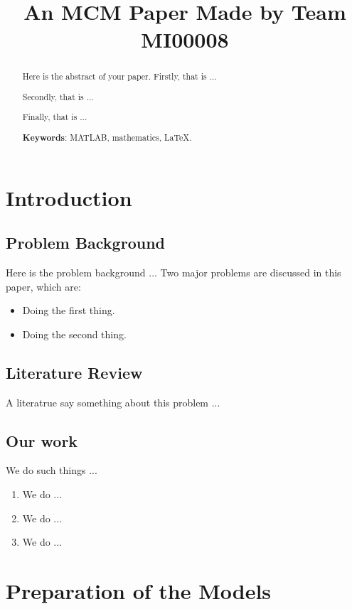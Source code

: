 \documentclass[12pt]{article}  %
\title{An MCM Paper Made by Team MI00008}  %
\begin{document}
\begin{abstract}
    Here is the abstract of your paper.
    Firstly, that is ...

    Secondly, that is ...

    Finally, that is ...

    \vspace{5pt}
    \textbf{Keywords}: MATLAB, mathematics, LaTeX.

\end{abstract}

\maketitle  %
\tableofcontents  %


\section{Introduction}
\subsection{Problem Background}
Here is the problem background ...
Two major problems are discussed in this paper, which are:
\begin{itemize}
    \item Doing the first thing.
    \item Doing the second thing.
\end{itemize}

\subsection{Literature Review}
A literatrue\cite{1} say something about this problem ...

\subsection{Our work}
We do such things ...

\begin{enumerate}[\bfseries 1.]
    \item We do ...
    \item We do ...
    \item We do ...
\end{enumerate}

\section{Preparation of the Models}
\end{document}
